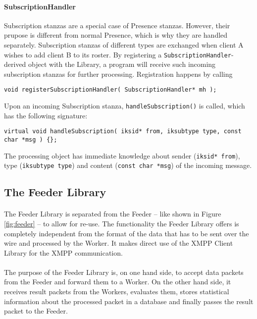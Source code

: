 \paragraph{SubscriptionHandler}
Subscription stanzas are a special case of Presence stanzas. However, their prupose is different from normal Presence, which is why they are handled separately. Subscription stanzas of different types are exchanged when client A wishes to add client B to its roster. By registering a \texttt{SubscriptionHandler}-derived object with the Library, a program will receive such incoming subscription stanzas for further processing. Registration happens by calling
\begin{flushleft}
\texttt{void registerSubscriptionHandler( SubscriptionHandler* mh );}
\end{flushleft}
Upon an incoming Subscription stanza, \texttt{handleSubscription()} is called, which has the following signature:
\begin{flushleft}
\texttt{virtual void handleSubscription( iksid* from, iksubtype type, const char *msg ) \{\};}
\end{flushleft}
The processing object has immediate knowledge about sender (\texttt{iksid* from}), type (\texttt{iksubtype type}) and content (\texttt{const char *msg}) of the incoming message.


\subsection{The Feeder Library}
\label{sec:feederlib}
\paragraph{}
The Feeder Library is separated from the Feeder -- like shown in Figure \ref{fig:feeder} -- to allow for re-use. The functionality the Feeder Library offers is completely independent from the format of the data that has to be sent over the wire and processed by the Worker. It makes direct use of the XMPP Client Library for the XMPP communication.

\paragraph{}
The purpose of the Feeder Library is, on one hand side, to accept data packets from the Feeder and forward them to a Worker. On the other hand side, it receives result packets from the Workers, evaluates them, stores statistical information about the processed packet in a database and finally passes the result packet to the Feeder.

